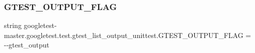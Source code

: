 \subsubsection{\texorpdfstring{GTEST\_OUTPUT\_FLAG}{GTEST\_OUTPUT\_FLAG}}
{\footnotesize\ttfamily string googletest-\/master.\+googletest.\+test.\+gtest\+\_\+list\+\_\+output\+\_\+unittest.\+G\+T\+E\+S\+T\+\_\+\+O\+U\+T\+P\+U\+T\+\_\+\+F\+L\+AG = \textquotesingle{}-\/-\/gtest\+\_\+output\textquotesingle{}}

